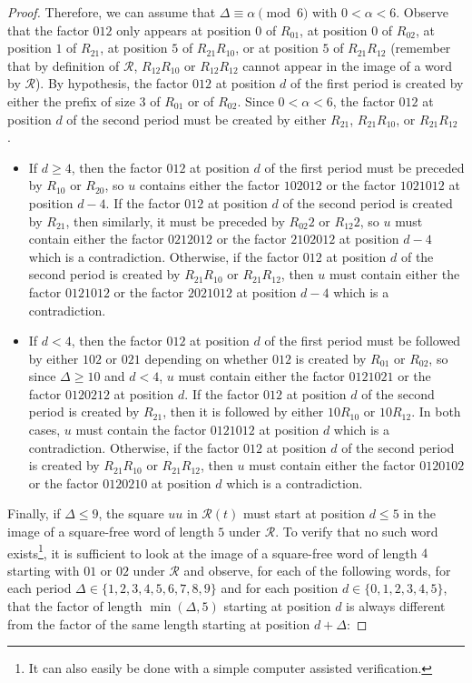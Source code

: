 \documentclass[12pt]{article}
\theoremstyle{definition}
\begin{document}
\begin{proof}
    Therefore, we can assume that $\Delta \equiv \alpha\pmod6$ with $0 < \alpha < 6$. 
    Observe that the factor $012$ only appears at position $0$ of $R_{01}$, at position $0$ of $R_{02}$, at position $1$ of $R_{21}$, at position $5$ of $R_{21}R_{10}$, or at position $5$ of $R_{21}R_{12}$ (remember that by definition of $\mathcal{R}$, $R_{12}R_{10}$ or $R_{12}R_{12}$ cannot appear in the image of a word by $\mathcal{R}$). By hypothesis, the factor $012$ at position $d$ of the first period is created by either the prefix of size $3$ of $R_{01}$ or of $R_{02}$. Since $0 < \alpha < 6$, the factor $012$ at position $d$ of the second period must be created by either $R_{21}$, $R_{21}R_{10}$, or $R_{21}R_{12}$ . 
    \begin{itemize}
        \item If $d \geq 4$, then the factor $012$ at position $d$ of the first period must be preceded by $R_{10}$ or $R_{20}$, so $u$ contains either the factor $102012$ or the factor $1021012$ at position $d - 4$. If the factor $012$ at position $d$ of the second period is created by $R_{21}$, then similarly, it must be preceded by $R_{02}2$ or $R_{12}2$, so $u$ must contain either the factor $0212012$ or the factor $2102012$ at position $d - 4$ which is a contradiction. Otherwise, if the factor $012$ at position $d$ of the second period is created by $R_{21}R_{10}$ or $R_{21}R_{12}$, then $u$ must contain either the factor $0121012$ or the factor $2021012$ at position $d - 4$ which is a contradiction.
        \item If $d < 4$, then the factor $012$ at position $d$ of the first period must be followed by either $102$ or $021$ depending on whether $012$ is created by $R_{01}$ or $R_{02}$, so since $\Delta \geq 10$ and $d < 4$, $u$ must contain either the factor $0121021$ or the factor $0120212$ at position $d$. If the factor $012$ at position $d$ of the second period is created by $R_{21}$, then it is followed by either $10R_{10}$ or $10R_{12}$. In both cases, $u$ must contain the factor $0121012$ at position $d$ which is a contradiction. Otherwise, if the factor $012$ at position $d$ of the second period is created by $R_{21}R_{10}$ or $R_{21}R_{12}$, then $u$ must contain either the factor $0120102$ or the factor $0120210$ at position $d$ which is a contradiction.
    \end{itemize}
    Finally, if $\Delta \leq 9$, the square $uu$ in $\mathcal{R}(t)$ must start at position $d \leq 5$ in the image of a square-free word of length $5$ under $\mathcal{R}$. To verify that no such word exists\footnote{It can also easily be done with a simple computer assisted verification.}, it is sufficient to look at the image of a square-free word of length $4$ starting with $01$ or $02$ under $\mathcal{R}$ and observe, for each of the following words, for each period $\Delta \in \{1, 2, 3, 4, 5, 6, 7, 8, 9\}$ and for each position $d \in \{0, 1, 2, 3, 4, 5\}$, that the factor of length $\min(\Delta, 5)$ starting at position $d$ is always different from the factor of the same length starting at position $d + \Delta$:

\end{proof}
\end{document}
